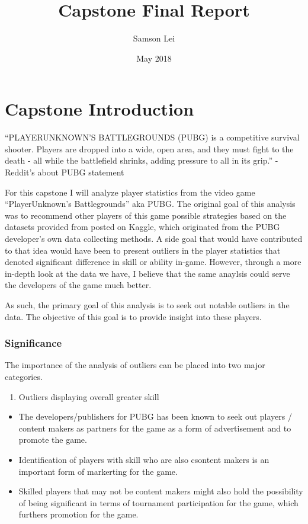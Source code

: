 \documentclass[]{article}
\title{Capstone Final Report}
\author{Samson Lei}
\date{May 2018}
\providecommand{\tightlist}{%
  \setlength{\itemsep}{0pt}\setlength{\parskip}{0pt}}
\begin{document}
\maketitle

\section{Capstone Introduction}\label{capstone-introduction}

``PLAYERUNKNOWN'S BATTLEGROUNDS (PUBG) is a competitive survival
shooter. Players are dropped into a wide, open area, and they must fight
to the death - all while the battlefield shrinks, adding pressure to all
in its grip.'' -Reddit's about PUBG statement

For this capstone I will analyze player statistics from the video game
``PlayerUnknown's Battlegrounds'' aka PUBG. The original goal of this
analysis was to recommend other players of this game possible strategies
based on the datasets provided from posted on Kaggle, which originated
from the PUBG developer's own data collecting methods. A side goal that
would have contributed to that idea would have been to present outliers
in the player statistics that denoted significant difference in skill or
ability in-game. However, through a more in-depth look at the data we
have, I believe that the same anaylsis could serve the developers of the
game much better.

As such, the primary goal of this analysis is to seek out notable
outliers in the data. The objective of this goal is to provide insight
into these players.

\subsubsection{Significance}\label{significance}

The importance of the analysis of outliers can be placed into two major
categories.

\begin{enumerate}
\def\labelenumi{\arabic{enumi}.}
\tightlist
\item
  Outliers displaying overall greater skill
\end{enumerate}

\begin{itemize}
\tightlist
\item
  The developers/publishers for PUBG has been known to seek out players
  / content makers as partners for the game as a form of advertisement
  and to promote the game.
\item
  Identification of players with skill who are also csontent makers is
  an important form of markerting for the game.
\item
  Skilled players that may not be content makers might also hold the
  possibility of being significant in terms of tournament participation
  for the game, which furthers promotion for the game.
\end{itemize}
\end{document}

